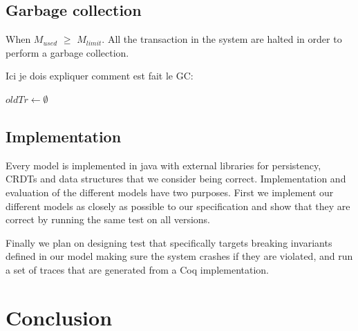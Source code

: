 \documentclass[parallelisme]{compas2022}
\begin{document}
\subsection{Garbage collection}
When \emph{$M_{used}$} $\geq$ \emph{$M_{limit}$}. 
All the transaction in the system are halted in order to perform a garbage collection.

Ici je dois expliquer comment est fait le GC:\\
\begin{algorithm}
  \(oldTr \longleftarrow \emptyset\)\;
\end{algorithm}




\subsection{Implementation}

Every model is implemented in java with external libraries for persistency, CRDTs and data structures that we consider being correct.
Implementation and evaluation of the different models have two purposes.
First we implement our different models as closely as possible to our specification and show that they are correct by running the same test on all versions.

Finally we plan on designing test that specifically targets breaking invariants defined in our model making sure the system crashes if they are violated, and run a set of traces that are generated from a Coq implementation.



\section{Conclusion}



\end{document}
